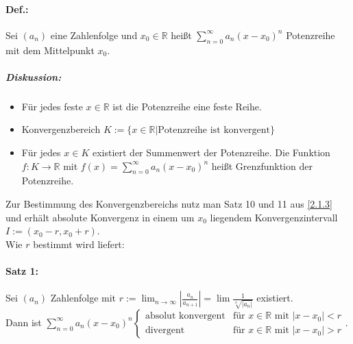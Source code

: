 \paragraph{Def.:} Sei $(a_n)$ eine Zahlenfolge und $x_0 \in \mathbb{R}$ heißt $\boxed{\sum_{n=0}^\infty a_n (x-x_0)^n}$ Potenzreihe mit dem Mittelpunkt $x_0$.
\subparagraph{Diskussion:} 
\begin{itemize}
\item Für jedes feste $x \in \mathbb{R}$ ist die Potenzreihe eine feste Reihe.
\item Konvergenzbereich $K:=\{x\in \mathbb{R} | \text{Potenzreihe ist konvergent}\}$
\item Für jedes $x\in K$ existiert der Summenwert der Potenzreihe. Die Funktion $f: K \to \mathbb{R}$ mit $f(x) = \sum_{n=0}^\infty a_n (x-x_0)^n$ heißt Grenzfunktion der Potenzreihe.
\end{itemize}
Zur Bestimmung des Konvergenzbereichs nutz man Satz 10 und 11 aus \ref{2.1.3} und erhält absolute Konvergenz in einem um $x_0$ liegendem Konvergenzintervall $I:=(x_0-r, x_0+r)$.\\
Wie $r$ bestimmt wird liefert:

\paragraph{Satz 1:} Sei $(a_n)$ Zahlenfolge mit $r:=\lim_{n\to \infty} \left| \frac{a_n}{a_{n+1}}\right|=\lim \frac{1}{\sqrt[n]{|a_n|}}$ existiert.\\
Dann ist $\sum_{n=0}^\infty a_n (x-x_0)^n\begin{cases}
\text{absolut konvergent} & \text{für }x\in \mathbb{R} \text{ mit }|x-x_0|<r\\
\text{divergent} & \text{für }x\in \mathbb{R} \text{ mit }|x-x_0|>r
\end{cases}$.

